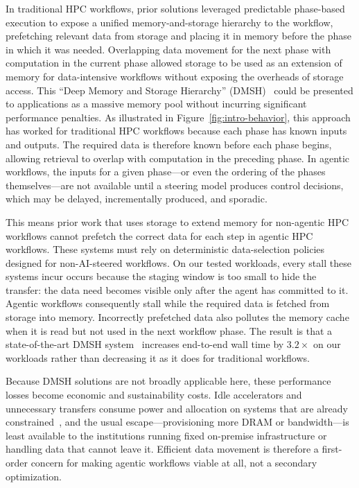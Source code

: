 In traditional HPC workflows, prior solutions leveraged predictable
phase-based execution to expose a unified memory-and-storage hierarchy to the
workflow, prefetching relevant data from storage and placing it in memory
before the phase in which it was needed. Overlapping data movement for the
next phase with computation in the current phase allowed storage to be used as
an extension of memory for data-intensive workflows without exposing the
overheads of storage access. This ``Deep Memory and Storage Hierarchy''
(DMSH)~\cite{hermes,megammap,hades} could be presented to applications as a
massive memory pool without incurring significant performance penalties. As illustrated in
Figure~\ref{fig:intro-behavior}, this approach has worked for traditional HPC
workflows because each phase has known inputs and outputs. The required data
is therefore known before each phase begins, allowing retrieval to overlap
with computation in the preceding phase. In agentic workflows, the inputs for
a given phase---or even the ordering of the phases themselves---are not
available until a steering model produces control decisions, which may be
delayed, incrementally produced, and sporadic.

This means prior work that uses storage to extend memory for non-agentic HPC
workflows cannot prefetch the correct data for each step in agentic HPC
workflows. These systems must rely on deterministic data-selection policies
designed for non-AI-steered workflows. On our tested workloads, every stall
these systems incur occurs because the staging window is too small to hide the
transfer: the data need becomes visible only after the agent has committed to
it. Agentic workflows consequently stall while the required data is fetched
from storage into memory. Incorrectly prefetched data also pollutes the memory
cache when it is read but not used in the next workflow phase. The result is
that a state-of-the-art DMSH system~\cite{megammap} increases end-to-end wall time by
$3.2\times$ on our workloads rather than decreasing it as it does for
traditional workflows.

Because DMSH solutions are not broadly applicable here, these performance
losses become economic and sustainability costs. Idle accelerators and
unnecessary transfers consume power and allocation on systems that are already
constrained~\cite{nvidia_h200_costs}, and the usual escape---provisioning more
DRAM or bandwidth---is
least available to the institutions running fixed on-premise infrastructure or
handling data that cannot leave it. Efficient data movement is therefore a
first-order concern for making agentic workflows viable at all, not a
secondary optimization.

